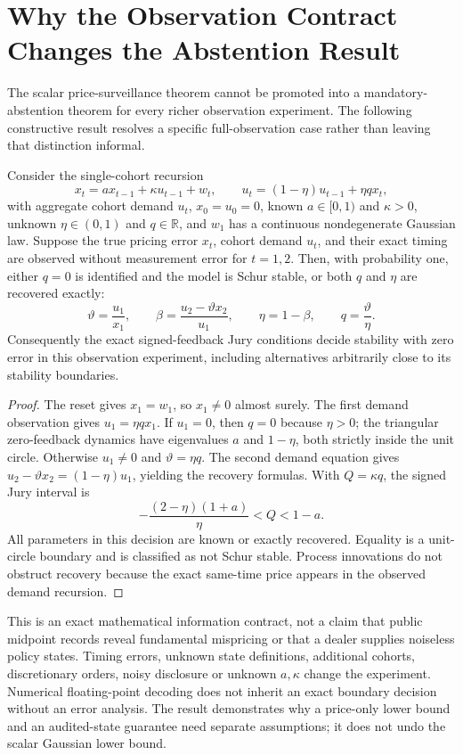 \section{Why the Observation Contract Changes the Abstention Result}
The scalar price-surveillance theorem cannot be promoted into a mandatory-abstention theorem for every richer observation experiment. The following constructive result resolves a specific full-observation case rather than leaving that distinction informal.
\begin{proposition}
\label{prop:exact_audited_contract}
Consider the single-cohort recursion
\[
x_t=a x_{t-1}+\kappa u_{t-1}+w_t,\qquad
u_t=(1-\eta)u_{t-1}+\eta q x_t,
\]
with aggregate cohort demand $u_t$, $x_0=u_0=0$, known $a\in[0,1)$ and $\kappa>0$, unknown $\eta\in(0,1)$ and $q\in\mathbb R$, and $w_1$ has a continuous nondegenerate Gaussian law. Suppose the true pricing error $x_t$, cohort demand $u_t$, and their exact timing are observed without measurement error for $t=1,2$. Then, with probability one, either $q=0$ is identified and the model is Schur stable, or both $q$ and $\eta$ are recovered exactly:
\[
\vartheta=\frac{u_1}{x_1},\qquad
\beta=\frac{u_2-\vartheta x_2}{u_1},\qquad
\eta=1-\beta,\qquad q=\frac{\vartheta}{\eta}.
\]
Consequently the exact signed-feedback Jury conditions decide stability with zero error in this observation experiment, including alternatives arbitrarily close to its stability boundaries.
\end{proposition}
\begin{proof}
The reset gives $x_1=w_1$, so $x_1\ne0$ almost surely. The first demand observation gives $u_1=\eta q x_1$. If $u_1=0$, then $q=0$ because $\eta>0$; the triangular zero-feedback dynamics have eigenvalues $a$ and $1-\eta$, both strictly inside the unit circle. Otherwise $u_1\ne0$ and $\vartheta=\eta q$. The second demand equation gives $u_2-\vartheta x_2=(1-\eta)u_1$, yielding the recovery formulas. With $Q=\kappa q$, the signed Jury interval is
\[
-\frac{(2-\eta)(1+a)}{\eta}<Q<1-a.
\]
All parameters in this decision are known or exactly recovered. Equality is a unit-circle boundary and is classified as not Schur stable. Process innovations do not obstruct recovery because the exact same-time price appears in the observed demand recursion.
\end{proof}
This is an exact mathematical information contract, not a claim that public midpoint records reveal fundamental mispricing or that a dealer supplies noiseless policy states. Timing errors, unknown state definitions, additional cohorts, discretionary orders, noisy disclosure or unknown $a,\kappa$ change the experiment. Numerical floating-point decoding does not inherit an exact boundary decision without an error analysis. The result demonstrates why a price-only lower bound and an audited-state guarantee need separate assumptions; it does not undo the scalar Gaussian lower bound.

